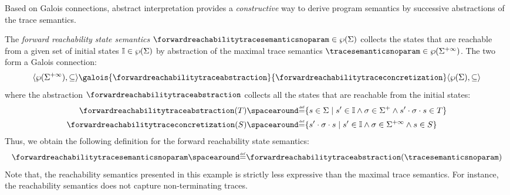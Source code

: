 Based on Galois connections, abstract interpretation provides a \emph{constructive} way to derive program semantics by successive abstractions of the trace semantics.

\begin{example}
  The \emph{forward reachability state semantics} $\forwardreachabilitytracesemanticsnoparam\in\forwardreachabilitytracetype$ collects the states that are reachable from a given set of initial states $\mathbb{I}\in\wp(\Sigma)$ by abstraction of the maximal trace semantics $\tracesemanticsnoparam\in\tracetype$. The two form a Galois connection:
  \begin{align*}
    \tuple{\tracetype}{\tracesubseteq}\galois{\forwardreachabilitytraceabstraction}{\forwardreachabilitytraceconcretization}\tuple{\forwardreachabilitytracetype}{\forwardreachabilitytracesubseteq}
  \end{align*}
  where the abstraction $\forwardreachabilitytraceabstraction$ collects all the states that are reachable from the initial states:
  \begin{align*}
    \forwardreachabilitytraceabstraction(\defsetoftraces) &\DefeQ \setdef{\defstate\in\state}{ \defstate'\in\initialstates \land \deftrace\in\finitesequences \land \concat{\concat{\defstate'}{\deftrace}}{\defstate} \in \defsetoftraces} \\
    \forwardreachabilitytraceconcretization(\defsetofstates) &\DefeQ \setdef{\concat{\concat{\defstate'}{\deftrace}}{\defstate}}{\defstate'\in\initialstates \land \deftrace\in\finiteinfinitesequences \land \defstate \in \defsetofstates}
  \end{align*}
Thus, we obtain the following definition for the forward reachability state semantics:
\[ \forwardreachabilitytracesemanticsnoparam \DefeQ \forwardreachabilitytraceabstraction(\tracesemanticsnoparam) \]
Note that, the reachability semantics presented in this example is strictly less expressive than the maximal trace semantics. For instance, the reachability semantics does not capture non-terminating traces.
\end{example}

